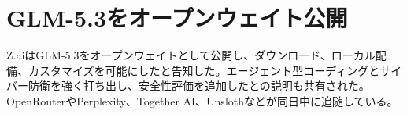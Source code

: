 \section{GLM-5.3をオープンウェイト公開}
Z.aiはGLM-5.3をオープンウェイトとして公開し、ダウンロード、ローカル配備、カスタマイズを可能にしたと告知した。エージェント型コーディングとサイバー防衛を強く打ち出し、安全性評価を追加したとの説明も共有された。OpenRouterやPerplexity、Together AI、Unslothなどが同日中に追随している。
